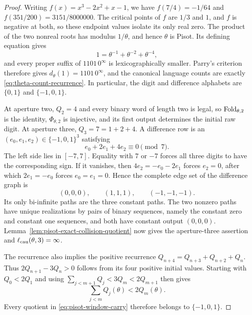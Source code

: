 \begin{proof}
Writing $f(x)=x^3-2x^2+x-1$, we have
$f(7/4)=-1/64$ and $f(351/200)=3151/8000000$.  The critical points of $f$
are $1/3$ and $1$, and $f$ is negative at both, so these endpoint values
isolate its only real zero.  The product of the two nonreal roots has modulus
$1/\theta$, and hence $\theta$ is Pisot.  Its defining equation gives
\[
1=\theta^{-1}+\theta^{-2}+\theta^{-4},
\]
and every proper suffix of $1101\,0^\infty$ is lexicographically smaller.
Parry's criterion therefore gives $d_\theta(1)=1101\,0^\infty$, and the
canonical language counts are exactly \eqref{eq:theta-count-recurrence}.
In particular, the digit and difference alphabets are $\{0,1\}$ and
$\{-1,0,1\}$.

At aperture two, $Q_2=4$ and every binary word of length two is legal, so
$\mathrm{Fold}_{\theta,2}$ is the identity, $\Phi_{\theta,2}$ is injective, and its
first output determines the initial raw digit.  At aperture three,
$Q_3=7=1+2+4$.  A difference row is an
$(e_0,e_1,e_2)\in\{-1,0,1\}^3$ satisfying
\[
e_0+2e_1+4e_2\equiv0\pmod 7.
\]
The left side lies in $[-7,7]$.  Equality with $7$ or $-7$ forces all three
digits to have the corresponding sign.  If it vanishes, then
$4e_2=-e_0-2e_1$ forces $e_2=0$, after which $2e_1=-e_0$ forces
$e_0=e_1=0$.  Hence the complete edge set of the difference graph is
\[
(0,0,0),\qquad (1,1,1),\qquad (-1,-1,-1).
\]
Its only bi-infinite paths are the three constant paths.  The two nonzero
paths have unique realizations by pairs of binary sequences, namely the
constant zero and constant one sequences, and both have constant output
$(0,0,0)$.  Lemma~\ref{lem:pisot-exact-collision-quotient} now gives the
aperture-three assertion and $\ell_{\rm cau}(\theta,3)=\infty$.

The recurrence also implies the positive recurrence
$Q_{n+4}=Q_{n+3}+Q_{n+2}+Q_n$.  Thus
$2Q_{n+1}-3Q_n>0$ follows from its four positive initial values.  Starting
with $Q_0<2Q_1$ and using
$\sum_{j<m+1}Q_j<3Q_m<2Q_{m+1}$ then gives
\begin{equation}
\sum_{j<m}Q_j(\theta)<2Q_m(\theta).
\label{eq:theta-carry-one}
\end{equation}
Every quotient in \eqref{eq:pisot-window-carry} therefore belongs to
$\{-1,0,1\}$.


\end{proof}

